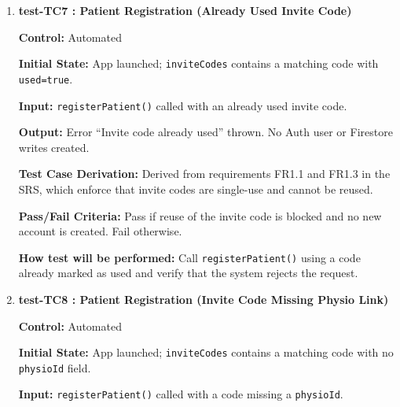 \documentclass[12pt, titlepage]{article}
\begin{document}
\begin{enumerate}
	\textbf{Output:} Error ``Invite code inactive'' thrown. No Auth user or Firestore writes created.
	
	\textbf{Test Case Derivation:} Derived from requirements FR1.1 and FR1.3 in the SRS, which state that inactive invite codes must not be accepted for patient registration.
	
	\textbf{Pass/Fail Criteria:} Pass if the inactive code is rejected and no account is created. Fail otherwise.
	
	\textbf{How test will be performed:} Call \texttt{registerPatient()} with an inactive invite code and verify that the request fails and no database writes occur.
	
	
	\vspace{0.5em}
	
	\item \textbf{test-TC7 : Patient Registration (Already Used Invite Code)}
	
	\textbf{Control:} Automated
	
	\textbf{Initial State:} App launched; \texttt{inviteCodes} contains a matching code with \texttt{used=true}.
	
	\textbf{Input:} \texttt{registerPatient()} called with an already used invite code.
	
	\textbf{Output:} Error ``Invite code already used'' thrown. No Auth user or Firestore writes created.
	
	\textbf{Test Case Derivation:} Derived from requirements FR1.1 and FR1.3 in the SRS, which enforce that invite codes are single-use and cannot be reused.
	
	\textbf{Pass/Fail Criteria:} Pass if reuse of the invite code is blocked and no new account is created. Fail otherwise.
	
	\textbf{How test will be performed:} Call \texttt{registerPatient()} using a code already marked as used and verify that the system rejects the request.
	
	
	\vspace{0.5em}
	
	\item \textbf{test-TC8 : Patient Registration (Invite Code Missing Physio Link)}
	
	\textbf{Control:} Automated
	
	\textbf{Initial State:} App launched; \texttt{inviteCodes} contains a matching code with no \texttt{physioId} field.
	
	\textbf{Input:} \texttt{registerPatient()} called with a code missing a \texttt{physioId}.
	

\end{enumerate}
\end{document}

